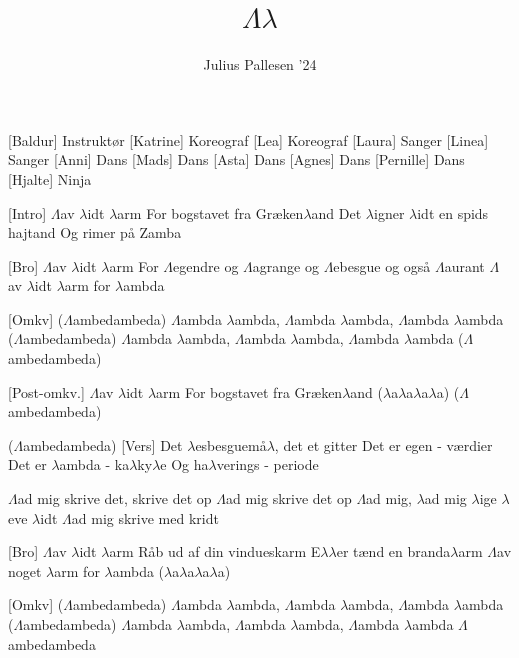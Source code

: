 \documentclass[a4paper,11pt]{article}
\title{$\Lambda \lambda$}
\author{Julius Pallesen '24}
\begin{document}
\maketitle

\begin{roles}
[Baldur] Instruktør
[Katrine] Koreograf
[Lea] Koreograf
[Laura] Sanger
[Linea] Sanger
[Anni] Dans
[Mads] Dans
[Asta] Dans
[Agnes] Dans
[Pernille] Dans
[Hjalte] Ninja
\end{roles}

\begin{song}
[Intro] $\Lambda$av $\lambda$idt $\lambda$arm
For bogstavet fra Græken$\lambda$and
Det $\lambda$igner $\lambda$idt en spids hajtand
Og rimer på Zamba

[Bro] $\Lambda$av $\lambda$idt $\lambda$arm
For $\Lambda$egendre og $\Lambda$agrange
og $\Lambda$ebesgue og også $\Lambda$aurant
$\Lambda$av $\lambda$idt $\lambda$arm for $\lambda$ambda

[Omkv] ($\Lambda$ambedambeda) 
$\Lambda$ambda $\lambda$ambda, $\Lambda$ambda $\lambda$ambda, $\Lambda$ambda $\lambda$ambda
($\Lambda$ambedambeda) 
$\Lambda$ambda $\lambda$ambda, $\Lambda$ambda $\lambda$ambda, $\Lambda$ambda $\lambda$ambda
($\Lambda$ambedambeda) 

[Post-omkv.] $\Lambda$av $\lambda$idt $\lambda$arm 
For bogstavet fra Græken$\lambda$and ($\lambda$a$\lambda$a$\lambda$a$\lambda$a)
($\Lambda$ambedambeda)

($\Lambda$ambedambeda)
[Vers] Det $\lambda$esbesguemå$\lambda$, det et gitter
Det er egen - værdier
Det er $\lambda$ambda - ka$\lambda$ky$\lambda$e
Og ha$\lambda$verings - periode

$\Lambda$ad mig skrive det, skrive det op 
$\Lambda$ad mig skrive det op
$\Lambda$ad mig, $\lambda$ad mig $\lambda$ige $\lambda$eve $\lambda$idt
$\Lambda$ad mig skrive med kridt

[Bro] $\Lambda$av $\lambda$idt $\lambda$arm
Råb ud af din vindueskarm 
E$\lambda$$\lambda$er tænd en branda$\lambda$arm
$\Lambda$av noget $\lambda$arm for $\lambda$ambda ($\lambda$a$\lambda$a$\lambda$a$\lambda$a)

[Omkv] ($\Lambda$ambedambeda) 
$\Lambda$ambda $\lambda$ambda, $\Lambda$ambda $\lambda$ambda, $\Lambda$ambda $\lambda$ambda
($\Lambda$ambedambeda) 
$\Lambda$ambda $\lambda$ambda, $\Lambda$ambda $\lambda$ambda, $\Lambda$ambda $\lambda$ambda
$\Lambda$ambedambeda


\end{song}
\end{document}
